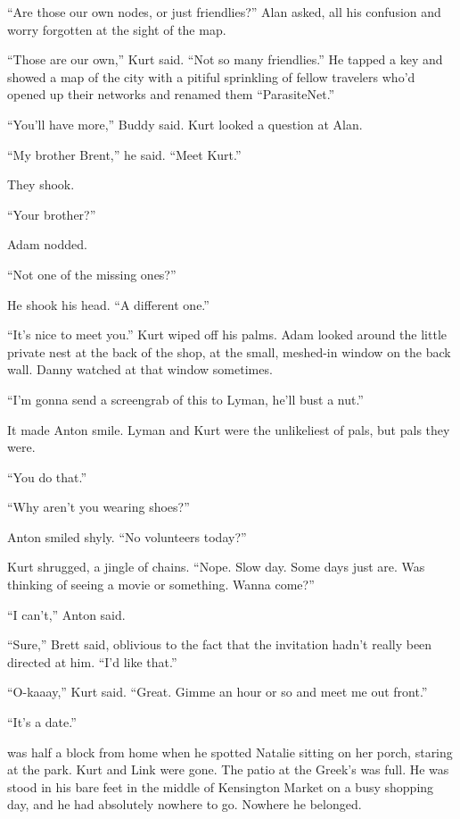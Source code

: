 ``Are those our own nodes, or just friendlies?'' Alan asked, all his
confusion and worry forgotten at the sight of the map. 

``Those are our own,'' Kurt said.  ``Not so many friendlies.'' He
tapped a key and showed a map of the city with a pitiful sprinkling of
fellow travelers who'd opened up their networks and renamed them
``ParasiteNet.''

``You'll have more,'' Buddy said.  Kurt looked a question at Alan.

``My brother Brent,'' he said.  ``Meet Kurt.''

They shook. 

``Your brother?''

Adam nodded.

``Not one of the missing ones?''

He shook his head.  ``A different one.''

``It's nice to meet you.'' Kurt wiped off his palms.  Adam looked
around the little private nest at the back of the shop, at the small,
meshed-in window on the back wall.  Danny watched at that window
sometimes.

``I'm gonna send a screengrab of this to Lyman, he'll bust a nut.''

It made Anton smile.  Lyman and Kurt were the unlikeliest of pals, but
pals they were.

``You do that.''

``Why aren't you wearing shoes?''

Anton smiled shyly.  ``No volunteers today?''

Kurt shrugged, a jingle of chains.  ``Nope.  Slow day.  Some days just
are.  Was thinking of seeing a movie or something.  Wanna come?''

``I can't,'' Anton said. 

``Sure,'' Brett said, oblivious to the fact that the invitation hadn't
really been directed at him.  ``I'd like that.''

``O-kaaay,'' Kurt said.  ``Great.  Gimme an hour or so and meet me out
front.''

``It's a date.''

 was half a block from home when he spotted Natalie sitting on her
porch, staring at the park.  Kurt and Link were gone.  The patio at
the Greek's was full.  He was stood in his bare feet in the middle of
Kensington Market on a busy shopping day, and he had absolutely
nowhere to go.  Nowhere he belonged.

